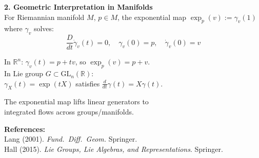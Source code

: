 \begin{technical}
\vspace{0.5em}
\noindent\textbf{2. Geometric Interpretation in Manifolds}\\[-0.5em]

For Riemannian manifold \( M \), \( p \in M \), the exponential map \( \exp_p(v) := \gamma_v(1) \) where \( \gamma_v \) solves:
\[ \frac{D}{dt} \dot{\gamma}_v(t) = 0, \quad \gamma_v(0) = p, \quad \dot{\gamma}_v(0) = v \]

In \( \mathbb{R}^n \): \( \gamma_v(t) = p + tv \), so \( \exp_p(v) = p + v \).\\
In Lie group \( G \subset \mathrm{GL}_n(\mathbb{R}) \):\\
\( \gamma_X(t) = \exp(tX) \) satisfies \( \frac{d}{dt}\gamma(t) = X\gamma(t) \).

The exponential map lifts linear generators to\\
integrated flows across groups/manifolds.

\vspace{0.3em}
\noindent\textbf{References:}\\
{\footnotesize
Lang (2001). \textit{Fund.\ Diff.\ Geom.} Springer.\\
Hall (2015). \textit{Lie Groups, Lie Algebras, and Representations}. Springer.
}
\end{technical}